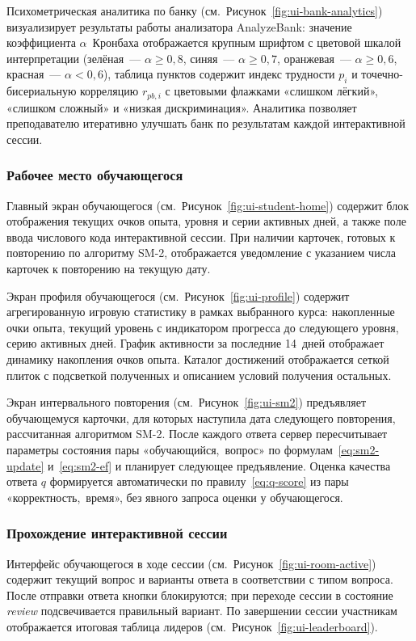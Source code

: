 Психометрическая аналитика по банку
(см.~Рисунок~\ref{fig:ui-bank-analytics}) визуализирует результаты
работы анализатора AnalyzeBank: значение коэффициента
$\alpha$~Кронбаха отображается крупным шрифтом с цветовой
шкалой интерпретации (зелёная~--- $\alpha \geq 0{,}8$, синяя~---
$\alpha \geq 0{,}7$, оранжевая~--- $\alpha \geq 0{,}6$,
красная~--- $\alpha < 0{,}6$), таблица пунктов содержит индекс
трудности $p_i$ и точечно-бисериальную корреляцию $r_{pb,i}$
с цветовыми флажками «слишком лёгкий», «слишком сложный»
и «низкая дискриминация». Аналитика позволяет преподавателю
итеративно улучшать банк по результатам каждой интерактивной
сессии.

\subsubsection{Рабочее место обучающегося}

Главный экран обучающегося
(см.~Рисунок~\ref{fig:ui-student-home}) содержит блок отображения
текущих очков опыта, уровня и серии активных дней, а также поле
ввода числового кода интерактивной сессии. При наличии карточек,
готовых к повторению по алгоритму SM-2, отображается уведомление
с указанием числа карточек к повторению на текущую дату.

Экран профиля обучающегося (см.~Рисунок~\ref{fig:ui-profile})
содержит агрегированную игровую статистику в рамках выбранного
курса: накопленные очки опыта, текущий уровень с индикатором
прогресса до следующего уровня, серию активных дней. График
активности за последние 14~дней отображает динамику накопления
очков опыта. Каталог достижений отображается сеткой плиток
с подсветкой полученных и описанием условий получения остальных.

Экран интервального повторения
(см.~Рисунок~\ref{fig:ui-sm2}) предъявляет обучающемуся карточки,
для которых наступила дата следующего повторения, рассчитанная
алгоритмом SM-2. После каждого ответа сервер пересчитывает
параметры состояния пары «обучающийся,~вопрос» по
формулам~\eqref{eq:sm2-update} и~\eqref{eq:sm2-ef} и планирует
следующее предъявление. Оценка качества ответа $q$ формируется
автоматически по правилу~\eqref{eq:q-score} из пары
«корректность,~время», без явного запроса оценки у обучающегося.

\subsubsection{Прохождение интерактивной сессии}

Интерфейс обучающегося в ходе сессии
(см.~Рисунок~\ref{fig:ui-room-active}) содержит текущий вопрос
и варианты ответа в соответствии с типом вопроса. После отправки
ответа кнопки блокируются; при переходе сессии в состояние
\emph{review} подсвечивается правильный вариант. По завершении
сессии участникам отображается итоговая таблица лидеров
(см.~Рисунок~\ref{fig:ui-leaderboard}).

